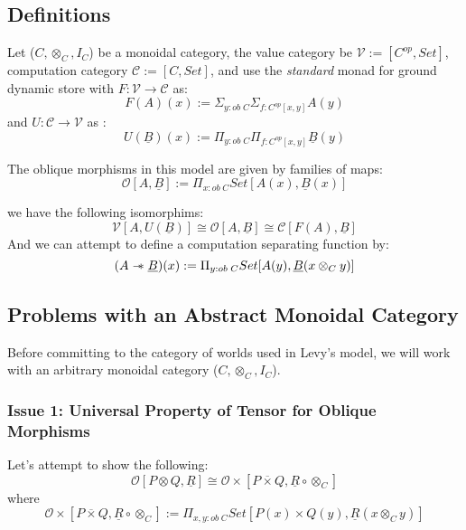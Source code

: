 \documentclass{article}
\newcommand{\sep}{\mathrel{-\mkern-6mu*}}
\begin{document}
\subsection{Definitions}
Let ($C, \otimes_C , I_C$) be a monoidal category, the value category be $\mathcal{V} := [C^{op} , Set]$, 
computation category $\mathcal{C} := [C , Set]$, and use the \textit{standard}
monad for ground dynamic store with $F : \mathcal{V} \rightarrow \mathcal{C}$ as:
\[
    F(A)(x) := \Sigma_{y : ob \;C}\Sigma_{f : C^{op}[ x , y ]}A(y)    
\]
and $U : \mathcal{C} \rightarrow \mathcal{V}$ as :
\[
    U(\underline{B})(x) := \Pi_{y : ob \; C}\Pi_{f : C^{op}[ x , y]}\underline{B}(y)   
\]

The oblique morphisms in this model are given by families of maps:
\[
    \mathcal{O}[A , \underline{B}] := \Pi_{x : ob \; C} Set[A(x) , \underline{B}(x)]   
\]

we have the following isomorphims:
\[
    \mathcal{V}[A , U(\underline{B})] \cong \mathcal{O}[A , \underline{B}] \cong \mathcal{C}[F(A) , \underline{B}]   
\]
And we can attempt to define a computation separating function by:
\[
    (A \sep \underline{B})(x) := \Pi_{y : ob \;C} Set[A(y), \underline{B}(x \otimes_C y)]
\]
\subsection{Problems with an Abstract Monoidal Category}
Before committing to the category 
of worlds used in Levy's model, we will work with an arbitrary monoidal category ($C, \otimes_C , I_C$). 
\subsubsection{Issue 1: Universal Property of Tensor for Oblique Morphisms}
Let's attempt to show the following:
\[
  \mathcal{O}[P \otimes Q , \underline{R}] \cong \mathcal{O\times}[P \overline{\times} Q , \underline{R} \circ \otimes_C]  
\]
where 
\[
    \mathcal{O\times}[P \overline{\times} Q , \underline{R} \circ \otimes_C] 
    := \Pi_{x , y : ob \;C}Set[P(x)\times Q(y) , \underline{R}(x \otimes_C y)]
\]
\end{document}
